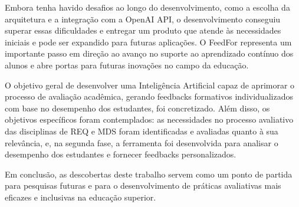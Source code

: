 Embora tenha havido desafios ao longo do desenvolvimento, como a escolha da arquitetura e a integração com a OpenAI API, o desenvolvimento conseguiu superar essas dificuldades e entregar um produto que atende às necessidades iniciais e pode ser expandido para futuras aplicações. O FeedFor representa um importante passo em direção ao avanço no suporte ao aprendizado contínuo dos alunos e abre portas para futuras inovações no campo da educação.

O objetivo geral de desenvolver uma Inteligência Artificial capaz de aprimorar o processo de avaliação acadêmica, gerando feedbacks formativos individualizados com base no desempenho dos estudantes, foi concretizado. Além disso, os objetivos específicos foram contemplados: as necessidades no processo avaliativo das disciplinas de REQ e MDS foram identificadas e avaliadas quanto à sua relevância, e, na segunda fase, a ferramenta foi desenvolvida para analisar o desempenho dos estudantes e fornecer feedbacks personalizados.

Em conclusão, as descobertas deste trabalho servem como um ponto de partida para pesquisas futuras e para o desenvolvimento de práticas avaliativas mais eficazes e inclusivas na educação superior.